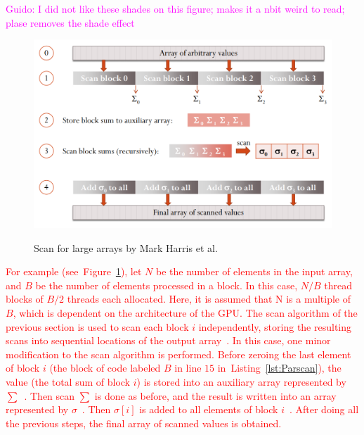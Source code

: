 \documentclass[Ingles]{ic-tese-v1}
\newcommand{\guido}[1]{\noindent\textcolor{magenta}{Guido: {#1}}}
\newcommand{\ed}[1]{\noindent\textcolor{red}{ {#1}}}
\newcommand{\guido}[1]{}
\newcommand{\ed}[1]{}
\newcommand{\rfig}[1]{Figure~\ref{fig:#1}}
\newcommand{\rlst}[1]{Listing~\ref{lst:#1}}
\begin{document}
\guido{I did not like these shades on this figure; makes it a nbit weird to read; plase removes the shade effect}
\begin{figure}[t]
	\centering
	\caption{Scan for large arrays by Mark Harris et al.}
	\includegraphics[scale=0.4]{images/largescan.png}
	\label{fig:largescan}
\end{figure}

\ed{For example (see~\rfig{largescan}), let $N$ be the number of elements in
the input array, and $B$ be the number of elements processed in a block. In this case,
$N/B$ thread blocks of $B/2$ threads each allocated. Here,  it is assumed that N
is a multiple of $B$, which is dependent on the architecture  of the GPU. The scan
algorithm of the previous section is used  to scan each block $i$ independently,
storing the resulting scans into sequential locations of the output
array~\ding{172}. In this case,  one minor modification to the scan algorithm is performed.
Before zeroing the last element of block $i$ (the block of code labeled $B$ in
line $15$ in~\rlst{Parscan}), the value (the total sum of block
$i$) is stored into an auxiliary array represented by $\sum$~\ding{173}. Then scan $\sum$
is done as before, and the  result is written into an array represented by
$\sigma$~\ding{174}. Then $\sigma[i]$ is added to all elements of block
$i$~\ding{175}. After doing all the previous steps, the final
array of scanned values is obtained.}
\end{document}
